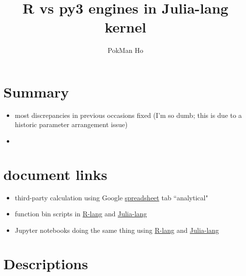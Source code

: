 \documentclass[a4paper,11pt]{article}
\title{R vs py3 engines in Julia-lang kernel}
\author{PokMan Ho}
\begin{document}
    \maketitle
    \section{Summary}
    \begin{itemize}
        \item most discrepancies in previous occasions fixed (I'm so dumb; this is due to a historic parameter arrangement issue)
        \item 
    \end{itemize}
    
    \section{document links}
    \begin{itemize}
        \item third-party calculation using Google  \href{https://docs.google.com/spreadsheets/d/1k4eZ2qmefPx8dAj6BVPFUE00JBayk8zqMAfbH60slB8/edit#gid=939440998}{spreadsheet} tab ``analytical"
        \item function bin scripts in \href{https://github.com/ph-u/Project/blob/master/code/func.R}{R-lang} and \href{https://github.com/ph-u/Project/blob/master/code/func.jl}{Julia-lang}
        \item Jupyter notebooks doing the same thing using \href{https://nbviewer.jupyter.org/github/ph-u/Project/blob/master/sandbox/cpb_0514_r.ipynb}{R-lang} and \href{https://nbviewer.jupyter.org/github/ph-u/Project/blob/master/sandbox/cpb_0514_jp.ipynb}{Julia-lang}
    \end{itemize}
    
    \section{Descriptions}
    
\end{document}

